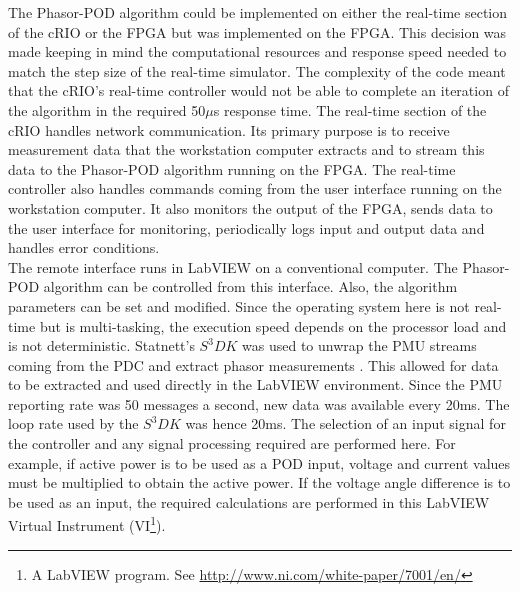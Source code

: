 \documentclass[journal]{IEEEtran}
\begin{document}
The Phasor-POD algorithm could be implemented on either the real-time section of the cRIO or the FPGA but was implemented on the FPGA. This decision was made keeping in mind the computational resources and response speed needed to match the step size of the real-time simulator. The complexity of the code meant that the cRIO\rq{s} real-time controller would not be able to complete an iteration of the algorithm in the required 50$\mu$s response time. The real-time section of the cRIO handles network communication. Its primary purpose is to receive measurement data that the workstation computer extracts and to stream this data to the Phasor-POD algorithm running on the FPGA. The real-time controller also handles commands coming from the user interface running on the workstation computer.  It also monitors the output of the FPGA, sends data to the user interface for monitoring, periodically logs input and output data and handles error conditions.\\

The remote interface runs in LabVIEW on a conventional computer. The Phasor-POD algorithm can be controlled from this interface. Also, the algorithm parameters can be set and modified. Since the operating system here is not real-time but is multi-tasking, the execution speed depends on the processor load and is not deterministic. Statnett's $S^{3}DK$ was used to unwrap the PMU streams coming from the PDC and extract phasor measurements \cite{SDK}. This allowed for data to be extracted and used directly in the LabVIEW environment. Since the PMU reporting rate was 50 messages a second, new data was available every 20ms. The loop rate used by the $S^{3}DK$ was hence 20ms. The selection of an input signal for the controller and any signal processing required are performed here. For example, if active power is to be used as a POD input, voltage and current values must be multiplied to obtain the active power. If the voltage angle difference is to be used as an input, the required calculations are performed in this LabVIEW Virtual Instrument (VI\footnote{A LabVIEW program. See \url{http://www.ni.com/white-paper/7001/en/}}).


\end{document}
